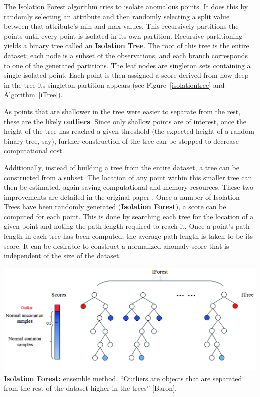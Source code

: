 \documentclass[20pt,landscape,footrule,headrule]{foils}
\newcommand{\newl}{\newline\newline}
\begin{document}
{{The Isolation Forest algorithm tries to isolate anomalous points. It does this by randomly selecting an attribute and then randomly selecting a split value between that attribute's min and max values. This recursively partitions the points until every point is isolated in its own partition.
\newl Recursive partitioning yields a binary tree called an \textbf{Isolation Tree}. The root of this tree is the entire dataset; each node is a subset of the observations, and each branch corresponds to one of the generated partitions. The leaf nodes are singleton sets containing a single isolated point. Each point is then assigned a score derived from how deep in the tree its singleton partition appears (see Figure~\ref{isolationtree} and Algorithm~\ref{iTree}). 
\par As points that are shallower in the tree were easier to separate from the rest, these are the likely \textbf{outliers}. Since only shallow points are of interest, once the height of the tree has reached a given threshold (the expected height of a random binary tree, say), further construction of the tree can be stopped to decrease computational cost. \par 
Additionally, instead of building a tree from the entire dataset, a tree can be constructed from a subset. The location of any point within this smaller tree can then be estimated, again saving computational and memory resources. These two improvements are detailed in the original paper \cite{A15}. 
\newl Once a number of Isolation Trees have been randomly generated (\textbf{Isolation Forest}), a score can be computed for each point. This is done by searching each tree for the location of a given point and noting the path length required to reach it. Once a point's path length in each tree has been computed, the average path length is taken to be its score.
\newpage\noindent  It can be desirable to construct a normalized anomaly score that is independent of the size of the dataset.
\newpage
\begin{center}
\includegraphics[width=\textwidth]{Images/IsoForest.png} \\ 
\textbf{Isolation Forest:} ensemble method. ``Outliers are objects that are separated from the rest of the dataset higher in the trees'' [Baron].
\end{center}

}}
\end{document}
